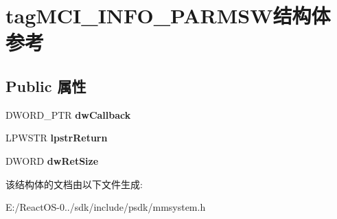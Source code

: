 \hypertarget{structtag_m_c_i___i_n_f_o___p_a_r_m_s_w}{}\section{tag\+M\+C\+I\+\_\+\+I\+N\+F\+O\+\_\+\+P\+A\+R\+M\+S\+W结构体 参考}
\label{structtag_m_c_i___i_n_f_o___p_a_r_m_s_w}
\subsection*{Public 属性}
\begin{DoxyCompactItemize}
\item 
\mbox{\label{structtag_m_c_i___i_n_f_o___p_a_r_m_s_w_a90cd941a14a43d16143484ce00a6d0fb}} 
D\+W\+O\+R\+D\+\_\+\+P\+TR {\bfseries dw\+Callback}
\item 
\mbox{\label{structtag_m_c_i___i_n_f_o___p_a_r_m_s_w_a01e7745669096d07a1ef68d31c6c1dec}} 
L\+P\+W\+S\+TR {\bfseries lpstr\+Return}
\item 
\mbox{\label{structtag_m_c_i___i_n_f_o___p_a_r_m_s_w_ac93a066f5b3b05376089fd406e607d56}} 
D\+W\+O\+RD {\bfseries dw\+Ret\+Size}
\end{DoxyCompactItemize}


该结构体的文档由以下文件生成\+:\begin{DoxyCompactItemize}
\item 
E\+:/\+React\+O\+S-\/0../sdk/include/psdk/mmsystem.\+h\end{DoxyCompactItemize}
